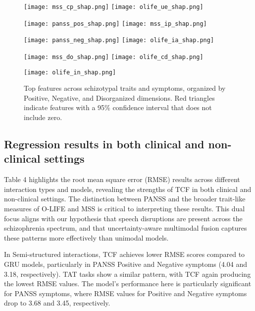 \documentclass[9pt,a4paper]{rho-class/rho}
\begin{document}
\begin{figure*}[htp]
    \centering

    \texttt{[image: mss\_cp\_shap.png]}
    \hfill
    \texttt{[image: olife\_ue\_shap.png]}

    \vspace{0.5em} %
    \texttt{[image: panss\_pos\_shap.png]}
    \hfill
    \texttt{[image: mss\_ip\_shap.png]}

    \vspace{0.5em}
    \texttt{[image: panss\_neg\_shap.png]}
    \hfill
    \texttt{[image: olife\_ia\_shap.png]}

    \vspace{0.5em}
    \texttt{[image: mss\_do\_shap.png]}
    \hfill
    \texttt{[image: olife\_cd\_shap.png]}

    \vspace{0.5em}
    \texttt{[image: olife\_in\_shap.png]}

    \caption{Top features across schizotypal traits and symptoms, organized by Positive, Negative, and Disorganized dimensions. Red triangles indicate features with a 95\% confidence interval that does not include zero.}
    \label{fig:shap_features}
\end{figure*}


\subsection{Regression results in both clinical and non-clinical settings}


Table 4 highlights the root mean square error (RMSE) results across different interaction types and models, revealing the strengths of TCF in both clinical and non-clinical settings. The distinction between PANSS and the broader trait-like measures of O-LIFE and MSS is critical to interpreting these results. This dual focus aligns with our hypothesis that speech disruptions are present across the schizophrenia spectrum, and that uncertainty-aware multimodal fusion captures these patterns more effectively than unimodal models.

In Semi-structured interactions, TCF achieves lower RMSE scores compared to GRU models, particularly in PANSS Positive and Negative symptoms (4.04 and 3.18, respectively). 
TAT tasks show a similar pattern, with TCF again producing the lowest RMSE values. The model's performance here is particularly significant for PANSS symptoms, where RMSE values for Positive and Negative symptoms drop to 3.68 and 3.45, respectively.
\end{document}
